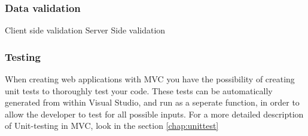 \subsubsection{Data validation}
Client side validation
Server Side validation

\subsubsection{Testing}
When creating web applications with MVC you have the possibility of creating unit tests to thoroughly test your code. These tests can be automatically generated from within Visual Studio, and run as a seperate function, in order to allow the developer to test for all possible inputs. For a more detailed description of Unit-testing in MVC, look in the section \ref{chap:unittest}

\cite{mvcconcept} \cite{mvcxeroxparc} \cite{aspdotnet}



